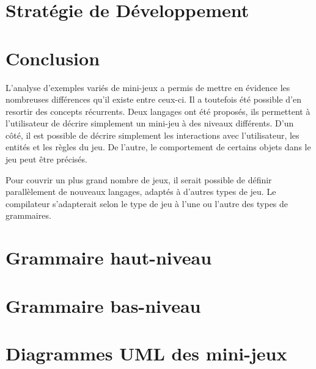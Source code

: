 \documentclass[a4paper,10pt]{article}
\begin{document}
\section{Stratégie de Développement}
\label{sec:strategie}


\section*{Conclusion}

L'analyse d'exemples variés de mini-jeux a permis de mettre en évidence les nombreuses différences qu'il existe entre ceux-ci.
Il a toutefois été possible d'en resortir des concepts récurrents.
Deux langages ont été proposés, ils permettent à l'utilisateur de décrire simplement un mini-jeu à des niveaux différents.
D'un côté, il est possible de décrire simplement les interactions avec l'utilisateur, les entités et les règles du jeu.
De l'autre, le comportement de certains objets dans le jeu peut être précisés.

Pour couvrir un plus grand nombre de jeux, il serait possible de définir parallèlement de nouveaux langages, adaptés à d'autres types de jeu.
Le compilateur s'adapterait selon le type de jeu à l'une ou l'autre des types de grammaires.


\clearpage
\appendix

\section{Grammaire haut-niveau}
\label{sec:hautniveau}


\section{Grammaire bas-niveau}
\label{sec:basniveau}


\clearpage
\section{Diagrammes UML des mini-jeux}
\label{sec:uml}

\end{document}
